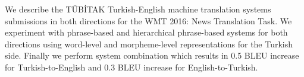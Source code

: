 We describe the TÜBİTAK Turkish-English machine translation systems submissions in both directions for the WMT 2016: News Translation Task. We experiment with phrase-based and hierarchical phrase-based systems for both directions using word-level and morpheme-level representations for the Turkish side. Finally we perform system combination which results in 0.5 BLEU increase for Turkish-to-English and 0.3 BLEU increase for English-to-Turkish.
